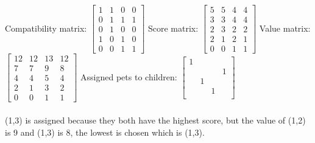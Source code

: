 \documentclass[a4paper,10pt]{article}
\begin{document}
Compatibility matrix:
\begin{math} 
\begin{bmatrix}
  1 & 1 & 0 & 0 \\
  0 & 1 & 1 & 1 \\
  0 & 1 & 0 & 0 \\
  1 & 0 & 1 & 0 \\
  0 & 0 & 1 & 1 
\end{bmatrix}\end{math}
Score matrix:
\begin{math}
\begin{bmatrix}
  5 & 5 & 4 & 4 \\
  3 & 3 & 4 & 4 \\
  2 & 3 & 2 & 2 \\
  2 & 1 & 2 & 1 \\
  0 & 0 & 1 & 1 
\end{bmatrix}
\end{math}
Value matrix:
\begin{math}
\begin{bmatrix}
  12 & 12 & 13 & 12 \\
  7 & 7 & 9 & 8 \\
  4 & 4 & 5 & 4 \\
  2 & 1 & 3 & 2 \\
  0 & 0 & 1 & 1 
\end{bmatrix}
\end{math}
Assigned pets to children:
\begin{math} 
\begin{bmatrix}
  1 &&& \\
  &&& 1 \\
  & 1&& \\
  && 1 & \\
  &&& 
\end{bmatrix}\end{math}\\\\
(1,3) is assigned because they both have the highest score, but the value of (1,2) is 9 and (1,3) is 8, the lowest is chosen which is (1,3). 
\end{document}
